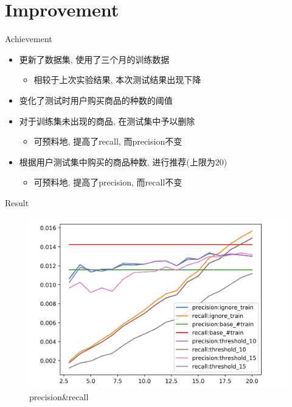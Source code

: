 \documentclass{beamer}
\begin{document}
  \section{Improvement}
  \begin{frame}{Achievement}
    \begin{itemize}
      \item 更新了数据集, 使用了三个月的训练数据
      \begin{itemize}
        \item 相较于上次实验结果, 本次测试结果出现下降
      \end{itemize}
      \item 变化了测试时用户购买商品的种数的阈值
      \item 对于训练集未出现的商品, 在测试集中予以删除
      \begin{itemize}
        \item 可预料地, 提高了recall, 而precision不变
      \end{itemize}
      \item 根据用户测试集中购买的商品种数, 进行推荐(上限为$20$)
      \begin{itemize}
        \item 可预料地, 提高了precision, 而recall不变
      \end{itemize}
    \end{itemize}
  \end{frame}
  
  \begin{frame}{Result}
    \begin{figure}
      \centering
      \includegraphics[width=\linewidth]{../result.png}
      \caption{precision\&recall}
    \end{figure}
  \end{frame}
  
\end{document}
